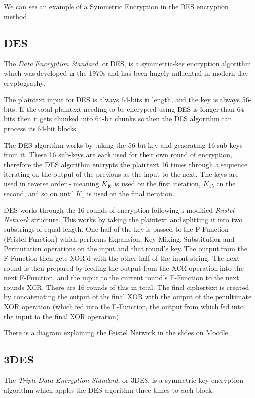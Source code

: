 We can see an example of a Symmetric Encryption in the DES encryption method.

\subsection{DES}
The \textit{Data Encryption Standard}, or DES, is a symmetric-key encryption algorithm which was developed in the 1970s and has been hugely influential in modern-day cryptography.

The plaintext input for DES is always 64-bits in length, and the key is always 56-bits. If the total plaintext needing to be encrypted using DES is longer than 64-bits then it gets chunked into 64-bit chunks so then the DES algorithm can process its 64-bit blocks. 

The DES algorithm works by taking the 56-bit key and generating 16 sub-keys from it. These 16 sub-keys are each used for their own round of encryption, therefore the DES algorithm encrypts the plaintext 16 times through a sequence iterating on the output of the previous as the input to the next. The keys are used in reverse order - meaning $K_{16}$ is used on the first iteration, $K_{15}$ on the second, and so on until $K_1$ is used on the final iteration. 

DES works through the 16 rounds of encryption following a modified \textit{Feistel Network} structure. This works by taking the plaintext and splitting it into two substrings of equal length. One half of the key is passed to the F-Function (Feistel Function) which performs Expansion, Key-Mixing, Substitution and Permutation operations on the input and that round's key. The output from the F-Function then gets XOR'd with the other half of the input string. The next round is then prepared by feeding the output from the XOR operation into the next F-Function, and the input to the current round's F-Function to the next rounds XOR. There are 16 rounds of this in total. The final ciphertext is created by concatenating the output of the final XOR with the output of the penultimate XOR operation (which fed into the F-Function, the output from which fed into the input to the final XOR operation). 

\begin{extlink}
There is a diagram explaining the Feistel Network in the slides on Moodle.
\end{extlink}


\subsection{3DES}
The \textit{Triple Data Encryption Standard}, or 3DES, is a symmetric-key encryption algorithm which apples the DES algorithm three times to each block. 

